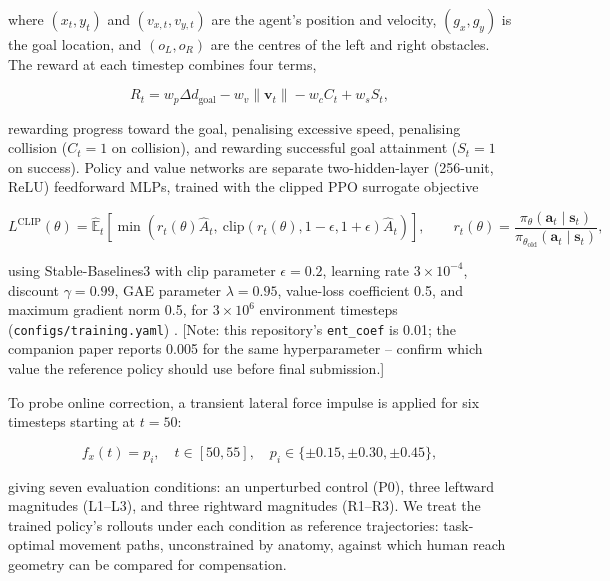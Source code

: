 \documentclass[11pt]{article}
\begin{document}
where $(x_t, y_t)$ and $(v_{x,t}, v_{y,t})$ are the agent's position and velocity, $(g_x, g_y)$ is the goal location, and $(o_L, o_R)$ are the centres of the left and right obstacles. The reward at each timestep combines four terms,

\begin{equation}
R_t = w_p \Delta d_{\text{goal}} - w_v \lVert \mathbf{v}_t \rVert - w_c C_t + w_s S_t,
\label{eq:reward}
\end{equation}

rewarding progress toward the goal, penalising excessive speed, penalising collision ($C_t=1$ on collision), and rewarding successful goal attainment ($S_t=1$ on success). Policy and value networks are separate two-hidden-layer (256-unit, ReLU) feedforward MLPs, trained with the clipped PPO surrogate objective

\begin{equation}
L^{\text{CLIP}}(\theta) = \hat{\mathbb{E}}_t\left[\min\left(r_t(\theta)\hat{A}_t,\ \text{clip}(r_t(\theta), 1-\epsilon, 1+\epsilon)\hat{A}_t\right)\right],
\qquad
r_t(\theta) = \frac{\pi_\theta(\mathbf{a}_t\mid \mathbf{s}_t)}{\pi_{\theta_{\text{old}}}(\mathbf{a}_t\mid \mathbf{s}_t)},
\label{eq:ppo-clip}
\end{equation}

using Stable-Baselines3 with clip parameter $\epsilon=0.2$, learning rate $3\times10^{-4}$, discount $\gamma=0.99$, GAE parameter $\lambda=0.95$, value-loss coefficient 0.5, and maximum gradient norm 0.5, for $3\times10^6$ environment timesteps (\texttt{configs/training.yaml}) \citep{Schulman2017}. [Note: this repository's \texttt{ent\_coef} is 0.01; the companion paper reports 0.005 for the same hyperparameter -- confirm which value the reference policy should use before final submission.]

To probe online correction, a transient lateral force impulse is applied for six timesteps starting at $t=50$:

\begin{equation}
f_x(t) = p_i, \quad t \in [50, 55], \quad p_i \in \{\pm0.15, \pm0.30, \pm0.45\},
\label{eq:perturbation}
\end{equation}

giving seven evaluation conditions: an unperturbed control (P0), three leftward magnitudes (L1--L3), and three rightward magnitudes (R1--R3). We treat the trained policy's rollouts under each condition as reference trajectories: task-optimal movement paths, unconstrained by anatomy, against which human reach geometry can be compared for compensation.
\end{document}
